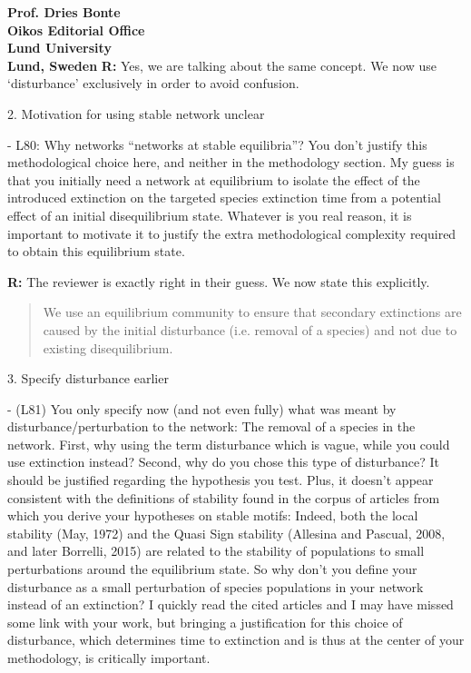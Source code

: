 \documentclass[12pt]{letter}
\begin{document}
\begin{letter}{\bf Prof. Dries Bonte\\
Oikos Editorial Office \\
Lund University \\
Lund, Sweden}
      \textbf{R:} Yes, we are talking about the same concept. We now use `disturbance' exclusively in order to avoid confusion.


    2. Motivation for using stable network unclear

      - L80: Why networks ``networks at stable equilibria''? You don’t justify this methodological choice here, and neither in the methodology section. My guess is that you initially need a network at equilibrium to isolate the effect of the introduced extinction on the targeted species extinction time from a potential effect of an initial disequilibrium state. Whatever is you real reason, it is important to motivate it to justify the extra methodological complexity  required to obtain this equilibrium state.

      \textbf{R:}
      The reviewer is exactly right in their guess. We now state this explicitly.
      
      \begin{quotation}
          We use an equilibrium community to ensure that secondary extinctions are caused by the initial disturbance (i.e. removal of a species) and not due to existing disequilibrium.
      \end{quotation}
      


    3. Specify disturbance earlier

      - (L81) You only specify now (and not even fully) what was meant by disturbance/perturbation to the network: The removal of a species in the network. First, why using the term disturbance which is vague, while you could use extinction instead? Second, why do you chose this type of disturbance? It should be justified regarding the hypothesis you test. Plus, it doesn't appear consistent with the definitions of stability found in the corpus of articles from which you derive your hypotheses on stable motifs: Indeed, both the local stability (May, 1972) and the Quasi Sign stability (Allesina and Pascual, 2008, and later Borrelli, 2015) are related to the stability of populations to small perturbations around the equilibrium state. So why don't you define your disturbance as a small perturbation of species populations in your network instead of an extinction? I quickly read the cited articles and I may have missed some link with your work, but bringing a justification for this choice of disturbance, which determines time to extinction and is thus at the center of your methodology, is critically important.


\end{letter}
\end{document}
